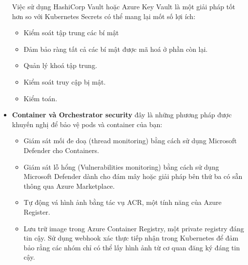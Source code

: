 \begin{itemize}
\begin{itemize}
        \end{itemize}
    Việc sử dụng HashiCorp Vault hoặc Azure Key Vault là một giải pháp tốt hơn so với Kubernetes Secrets có thể mang lại mốt số lợi ích:
        \begin{itemize}
            \item Kiểm soát tập trung các bí mật
            \item Đảm bảo ràng tất cả các bí mật được mã hoá ở phần còn lại.
            \item Quản lý khoá tập trung.
            \item Kiểm soát truy cập bị mật.
            \item Kiểm toán.
        \end{itemize}
    \item \textbf{Container và Orchestrator security} đây là những phương pháp được khuyến nghị để bảo vệ pods và container của bạn:

        \begin{itemize}
            \item Giám sát mối đe doạ (thread monitoring) bằng cách sử dụng Microsoft Defender cho Containers.
            \item Giám sát lỗ hổng (Vulnerabilities monitoring) bằng cách sử dụng Microsoft Defender dành cho đám mây hoặc giải pháp bên thứ ba có sẵn thông qua Azure Marketplace.
            \item Tự động vá hình ảnh bằng tác vụ ACR, một tính năng của Azure Register. 
            \item Lưu trữ image trong Azure Container Registry, một private registry đáng tin cậy. Sử dụng webhook xác thực tiếp nhận trong Kubernetes để đảm bảo rằng các nhóm chỉ có thể lấy hình ảnh từ cơ quan đăng ký đáng tin cậy.
        \end{itemize}
      
\end{itemize}
\newpage
